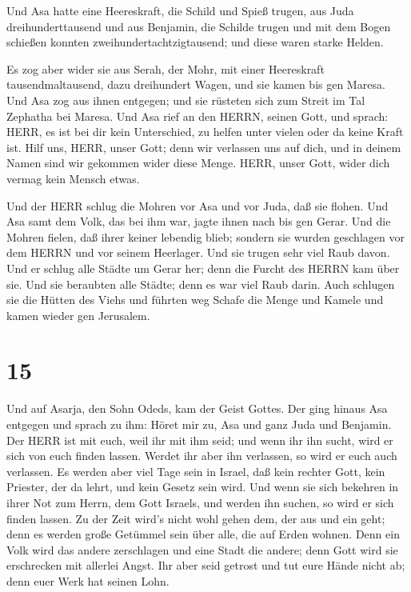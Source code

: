  Und Asa hatte eine Heereskraft, die Schild und Spieß
trugen, aus Juda dreihunderttausend und aus Benjamin, die Schilde trugen
und mit dem Bogen schießen konnten zweihundertachtzigtausend; und diese
waren starke Helden.

 Es zog aber wider sie aus Serah, der Mohr, mit einer
Heereskraft tausendmaltausend, dazu dreihundert Wagen, und sie kamen bis
gen Maresa.  Und Asa zog aus ihnen entgegen; und sie
rüsteten sich zum Streit im Tal Zephatha bei Maresa.  Und
Asa rief an den HERRN, seinen Gott, und sprach: HERR, es ist bei dir
kein Unterschied, zu helfen unter vielen oder da keine Kraft ist. Hilf
uns, HERR, unser Gott; denn wir verlassen uns auf dich, und in deinem
Namen sind wir gekommen wider diese Menge. HERR, unser Gott, wider dich
vermag kein Mensch etwas.

 Und der HERR schlug die Mohren vor Asa und vor Juda, daß
sie flohen.  Und Asa samt dem Volk, das bei ihm war, jagte
ihnen nach bis gen Gerar. Und die Mohren fielen, daß ihrer keiner
lebendig blieb; sondern sie wurden geschlagen vor dem HERRN und vor
seinem Heerlager. Und sie trugen sehr viel Raub davon.  Und
er schlug alle Städte um Gerar her; denn die Furcht des HERRN kam über
sie. Und sie beraubten alle Städte; denn es war viel Raub darin.
 Auch schlugen sie die Hütten des Viehs und führten weg
Schafe die Menge und Kamele und kamen wieder gen Jerusalem.

\hypertarget{section-14}{%
\section{15}\label{section-14}}

 Und auf Asarja, den Sohn Odeds, kam der Geist Gottes.
 Der ging hinaus Asa entgegen und sprach zu ihm: Höret mir
zu, Asa und ganz Juda und Benjamin. Der HERR ist mit euch, weil ihr mit
ihm seid; und wenn ihr ihn sucht, wird er sich von euch finden lassen.
Werdet ihr aber ihn verlassen, so wird er euch auch verlassen.
 Es werden aber viel Tage sein in Israel, daß kein rechter
Gott, kein Priester, der da lehrt, und kein Gesetz sein wird.
 Und wenn sie sich bekehren in ihrer Not zum Herrn, dem Gott
Israels, und werden ihn suchen, so wird er sich finden lassen.
 Zu der Zeit wird's nicht wohl gehen dem, der aus und ein
geht; denn es werden große Getümmel sein über alle, die auf Erden
wohnen.  Denn ein Volk wird das andere zerschlagen und eine
Stadt die andere; denn Gott wird sie erschrecken mit allerlei Angst.
 Ihr aber seid getrost und tut eure Hände nicht ab; denn
euer Werk hat seinen Lohn.

